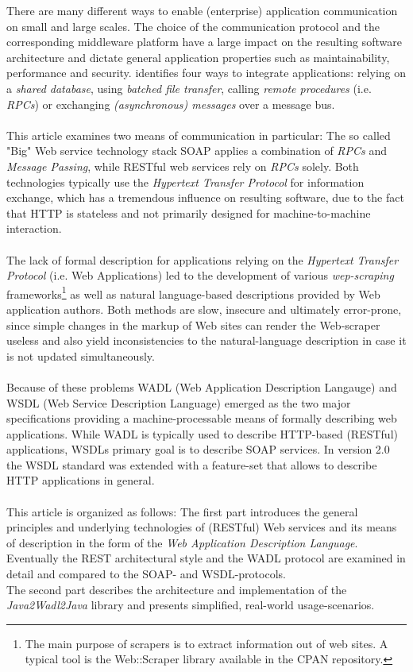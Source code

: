 There are many different ways to enable (enterprise) application communication on small and large scales. The choice of the communication protocol and the corresponding middleware platform have a large impact on the resulting software architecture and dictate general application properties such as maintainability, performance and security. \cite{BIGREST} identifies four ways to integrate applications: relying on a \emph{shared database}, using \emph{batched file transfer}, calling \emph{remote procedures} (i.e. \emph{RPCs}) or exchanging \emph{(asynchronous) messages} over a message bus.
\\ \\
This article examines two means of communication in particular: The so called "Big" Web service technology stack SOAP applies a combination of \emph{RPCs} and \emph{Message Passing}, while RESTful web services rely on \emph{RPCs} solely. \cite{WEBDSGN} Both technologies typically use the \emph{Hypertext Transfer Protocol} for information exchange, which has a tremendous influence on resulting software, due to the fact that HTTP is stateless and not primarily designed for machine-to-machine interaction. 
\\ \\
The lack of formal description for applications relying on the \emph{Hypertext Transfer Protocol} (i.e. Web Applications) led to the development of various \emph{wep-scraping} frameworks\footnote{The main purpose of scrapers is to extract information out of web sites. A typical tool is the Web::Scraper library available in the CPAN repository.} as well as natural language-based descriptions provided by Web application authors. Both methods are slow, insecure and ultimately error-prone, since simple changes in the markup of Web sites can render the Web-scraper useless and also yield inconsistencies to the natural-language description in case it is not updated simultaneously. \cite{WADLWSDL}
\\ \\
Because of these problems WADL (Web Application Description Langauge) and WSDL (Web Service Description Language) emerged as the two major specifications providing a machine-processable means of formally describing web applications. While WADL is typically used to describe HTTP-based (RESTful) applications, WSDLs primary goal is to describe SOAP services. In version 2.0 the WSDL standard was extended with a feature-set that allows to describe HTTP applications in general.
\\ \\
This article is organized as follows: The first part introduces the general principles and underlying technologies of (RESTful) Web services and its means of description in the form of the \emph{Web Application Description Language}. Eventually the REST architectural style and the WADL protocol are examined in detail and compared to the SOAP- and WSDL-protocols.
\\
The second part describes the architecture and implementation of the \emph{Java2Wadl2Java} library and presents simplified, real-world usage-scenarios.